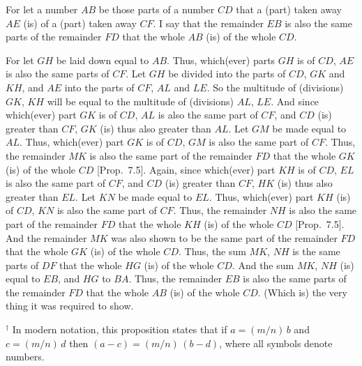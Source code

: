 \begin{Parallel}{}{}
{For let a number $AB$ be those parts of a number $CD$ that a
(part) taken away $AE$ (is) of a (part) taken away $CF$. I say that the remainder
$EB$ is also the same parts of the remainder $FD$ that the whole $AB$ (is) of the
whole $CD$.

For let $GH$ be laid down equal to $AB$. Thus, which(ever) parts $GH$ is of $CD$,
$AE$ is also the same parts of $CF$. Let $GH$ be divided into the parts
of $CD$, $GK$ and $KH$, and $AE$ into the parts of $CF$, $AL$ and $LE$. So the
multitude of (divisions) $GK$, $KH$ will be equal to the multitude of (divisions)
$AL$, $LE$. And since which(ever) part $GK$ is of $CD$, $AL$ is also the same part 
of $CF$, and $CD$ (is) greater than $CF$,  $GK$ (is) thus also greater than $AL$.
Let $GM$ be made equal to $AL$. Thus, which(ever) part $GK$ is of $CD$, $GM$ is also the same part of $CF$. Thus, the remainder $MK$ is also the same part of the
remainder $FD$ that  the whole $GK$ (is) of the whole $CD$ [Prop.~7.5]. Again, since
which(ever) part $KH$ is of $CD$, $EL$ is also the same part of $CF$, and
$CD$ (is) greater than $CF$, $HK$ (is) thus also greater than $EL$. Let $KN$ be
made equal to $EL$. Thus, which(ever) part $KH$ (is) of $CD$, $KN$ is also the
same part of $CF$. Thus, the remainder $NH$ is also the same part 
of the remainder $FD$ that the whole $KH$ (is) of the whole $CD$  [Prop.~7.5]. And the remainder $MK$
was also shown to be the same part of the remainder $FD$ that the whole
$GK$ (is) of the whole $CD$. Thus, the sum $MK$, $NH$ is the same parts of
$DF$ that the whole $HG$ (is) of the whole $CD$. And the sum $MK$, $NH$
(is) equal to $EB$, and $HG$ to $BA$. Thus, the remainder $EB$ is also
the same parts of the remainder $FD$ that the whole $AB$ (is)
of the whole $CD$. (Which is) the very thing it was required to show.}
\end{Parallel}
{\footnotesize\noindent$^\dag$ In modern notation, this
proposition states that if $a=(m/n)\,b$ and $c=(m/n)\,d$ then $(a-c)=
(m/n)\,(b-d)$, where all symbols denote numbers.}

